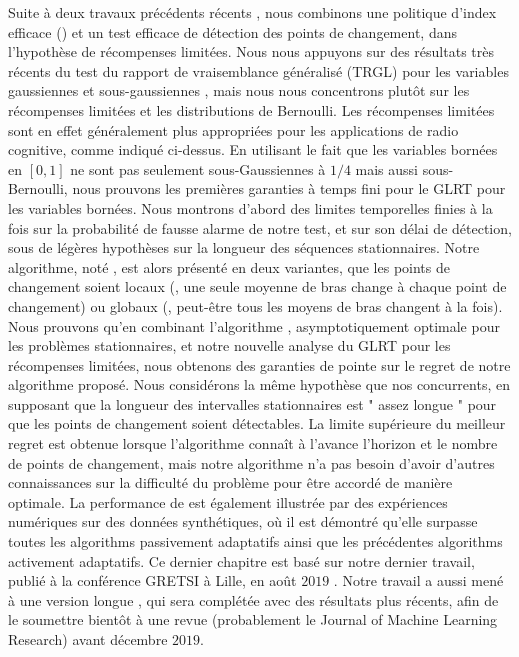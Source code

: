 \begin{resume_fr}
Suite à deux travaux précédents récents \cite{LiuLeeShroff17,CaoZhenKvetonXie18}, nous combinons une politique d'index efficace (\klUCB) et un test efficace de détection des points de changement, dans l'hypothèse de récompenses limitées.
Nous nous appuyons sur des résultats très récents du test du rapport de vraisemblance généralisé (TRGL) pour les variables gaussiennes et sous-gaussiennes \cite{Maillard2018GLR}, mais nous nous concentrons plutôt sur les récompenses limitées et les distributions de Bernoulli.
Les récompenses limitées sont en effet généralement plus appropriées pour les applications de radio cognitive, comme indiqué ci-dessus.
En utilisant le fait que les variables bornées en $[0,1]$ ne sont pas seulement sous-Gaussiennes à $1/4$ mais aussi sous-Bernoulli, nous prouvons les premières garanties à temps fini pour le GLRT pour les variables bornées.
Nous montrons d'abord des limites temporelles finies à la fois sur la probabilité de fausse alarme de notre test, et sur son délai de détection, sous de légères hypothèses sur la longueur des séquences stationnaires.
Notre algorithme, noté \GLRklUCB, est alors présenté en deux variantes, que les points de changement soient locaux (\ie, une seule moyenne de bras change à chaque point de changement) ou globaux (\ie, peut-être tous les moyens de bras changent à la fois).
%
Nous prouvons qu'en combinant l'algorithme \klUCB, asymptotiquement optimale pour les problèmes stationnaires, et notre nouvelle analyse du GLRT pour les récompenses limitées, nous obtenons des garanties de pointe sur le regret de notre algorithme proposé.
Nous considérons la même hypothèse que nos concurrents, en supposant que la longueur des intervalles stationnaires est " assez longue " pour que les points de changement soient détectables.
La limite supérieure du meilleur regret est obtenue lorsque l'algorithme connaît à l'avance l'horizon et le nombre de points de changement, mais notre algorithme n'a pas besoin d'avoir d'autres connaissances sur la difficulté du problème pour être accordé de manière optimale.
%
La performance de \GLRklUCB{} est également illustrée par des expériences numériques sur des données synthétiques, où il est démontré qu'elle surpasse toutes les algorithms passivement adaptatifs ainsi que les précédentes algorithms activement adaptatifs.
%
Ce dernier chapitre est basé sur notre dernier travail, publié à la conférence GRETSI à Lille, en août $2019$ \cite{Besson2019Gretsi}.
Notre travail a aussi mené à une version longue \cite{Besson2019GLRT}, qui sera complétée avec des résultats plus récents, afin de le soumettre bientôt à une revue (probablement le Journal of Machine Learning Research) avant décembre $2019$.



\end{resume_fr}
